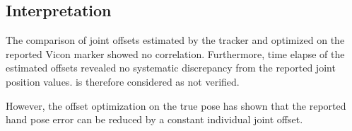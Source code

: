 \subsection{Interpretation}

The comparison of joint offsets estimated by the tracker and optimized on the reported Vicon marker showed no correlation. Furthermore, time elapse of the estimated offsets revealed no systematic discrepancy from the reported joint position values.  is therefore considered as not verified.

However, the offset optimization on the true pose has shown that the reported hand pose error can be reduced by a constant individual joint offset.
